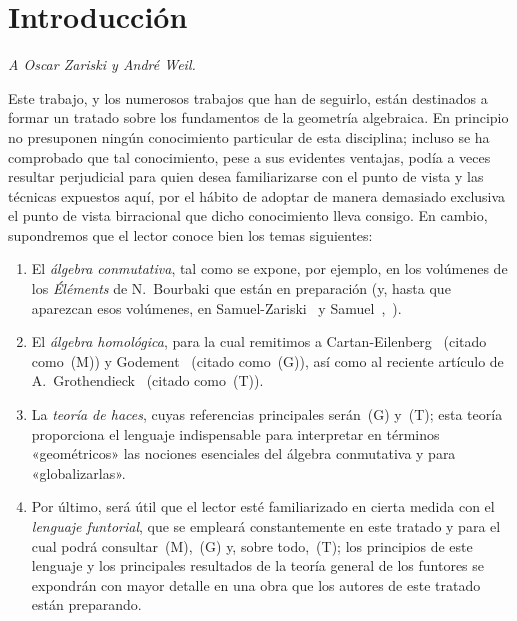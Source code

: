 
\section*{Introducción}

\begin{center}
\emph{A Oscar Zariski y André Weil.}
\end{center}


Este trabajo, y los numerosos trabajos que han de seguirlo, están destinados a formar un tratado sobre los fundamentos de la geometría algebraica.
En principio no presuponen ningún conocimiento particular de esta disciplina; incluso se ha comprobado que tal conocimiento, pese a sus evidentes ventajas, podía a veces resultar perjudicial para quien desea familiarizarse con el punto de vista y las técnicas expuestos aquí, por el hábito de adoptar de manera demasiado exclusiva el punto de vista birracional que dicho conocimiento lleva consigo.
En cambio, supondremos que el lector conoce bien los temas siguientes:

\begin{enumerate}
  \item[\textit{a)}] El \emph{álgebra conmutativa}, tal como se expone, por ejemplo, en los volúmenes de los \emph{Éléments} de N.~Bourbaki que están en preparación (y, hasta que aparezcan esos volúmenes, en Samuel-Zariski~\cite{I-13} y Samuel~\cite{I-11},~\cite{I-12}).
  \item[\textit{b)}] El \emph{álgebra homológica}, para la cual remitimos a Cartan-Eilenberg~\cite{I-2} (citado como~(M)) y Godement~\cite{I-4} (citado como~(G)), así como al reciente artículo de A.~Grothendieck~\cite{I-6} (citado como~(T)).
  \item[\textit{c)}] La \emph{teoría de haces}, cuyas referencias principales serán~(G) y~(T); esta teoría proporciona el lenguaje indispensable para interpretar en términos «geométricos» las nociones esenciales del álgebra conmutativa y para «globalizarlas».
  \item[\textit{d)}] Por último, será útil que el lector esté familiarizado en cierta medida con el \emph{lenguaje funtorial}, que se empleará constantemente en este tratado y para el cual podrá consultar~(M),~(G) y, sobre todo,~(T); los principios de este lenguaje y los principales resultados de la teoría general de los funtores se expondrán con mayor detalle en una obra que los autores de este tratado están preparando.
\end{enumerate}

